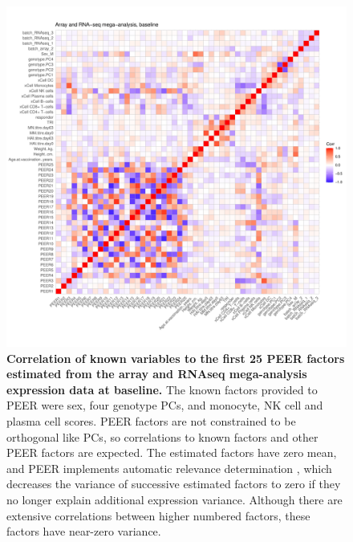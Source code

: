 \begin{figure}
    \centering
    \includegraphics[width=1.0\textwidth,page=1]{mainmatter/figures/chapter_03/peer_plotting.mega_v2.pdf}
    \caption{
        \textbf{Correlation of known variables to the first 25 PEER factors estimated from the array and \gls{RNAseq} mega-analysis expression data at baseline.}
        The known factors provided to PEER were sex, four genotype \glspl{PC}, and monocyte, \gls{NK} cell and plasma cell  scores.
        PEER factors are not constrained to be orthogonal like \glspl{PC}, so correlations to known factors and other PEER factors are expected.
        The estimated factors have zero mean, and PEER implements automatic relevance determination \autocite{stegle2012UsingProbabilisticEstimation}, which decreases the variance of successive estimated factors to zero if they no longer explain additional expression variance.
        Although there are extensive correlations between higher numbered factors, these factors have near-zero variance.
    }
    \label{fig:hird_peer_corMatrix_v2_mega}
\end{figure}

